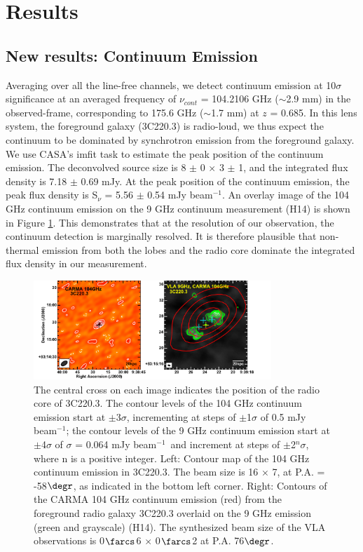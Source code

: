 \documentclass[twocolumn,apj,numberedappendix]{emulateapj}
\newcommand{\pmOne}{$^{-1}$}
\begin{document}
\section{Results}\label{sec:res}
\subsection{New results: Continuum Emission} 
Averaging over all the line-free channels, we detect continuum emission at 10$\sigma$ significance at an averaged frequency of $\nu_{cont}$ = 104.2106 GHz ($\sim$2.9 mm) in the observed-frame, corresponding to 175.6 GHz ($\sim$1.7 mm) at $z$ = 0.685. In this lens system, the 
foreground galaxy (3C220.3) is radio-loud, we thus expect the continuum to be dominated by synchrotron emission from the foreground galaxy. We use CASA's {\sc imfit} task to estimate the peak position of the continuum emission. The deconvolved source size is 8 $\pm$ 0 $\times$ 3 $\pm$ 1, and the integrated flux density is 7.18 $\pm$ 0.69 mJy. At the peak position of the continuum emission, the peak flux density is S$_\nu$ = 5.56 $\pm$ 0.54 
mJy beam\pmOne. An overlay image of the 104 GHz continuum emission on the 9 GHz continuum measurement (H14) is shown in Figure \ref{fig:cont}. This demonstrates that at the resolution of our observation, the continuum detection is marginally resolved. It is therefore plausible that non-thermal emission from both the lobes and the radio core dominate the integrated flux density in our measurement.

\begin{figure}[tbph]
\centering
\includegraphics[width=0.80\textwidth]{Figure/ContPanel}
\caption{The central cross on each image indicates the position of the radio core of 3C220.3. The contour levels of the 104 GHz continuum emission start at $\pm$3$\sigma$, incrementing at steps 
of $\pm$1$\sigma$ of 0.5 mJy beam\pmOne; the contour levels of the 9 GHz continuum 
emission start at $\pm$4$\sigma$ of $\sigma$ = 0.064 mJy beam\pmOne\ and increment at steps of $\pm$2$^n\sigma$, 
where n is a positive integer.
Left: Contour map of the 104 GHz continuum emission in 3C220.3. The beam size is 16 $\times$ 7, at P.A. = 
-58$\degr$, as indicated in the bottom left corner. Right: Contours of the CARMA 104 GHz continuum emission (red) from the 
foreground radio galaxy 3C220.3 overlaid on the 9 GHz emission (green and grayscale) (H14). The synthesized beam size of the VLA observations is 0$\farcs$6 $\times$ 0$\farcs$2 at P.A. 
76$\degr$. 
\label{fig:cont}}
\end{figure}
\end{document}
